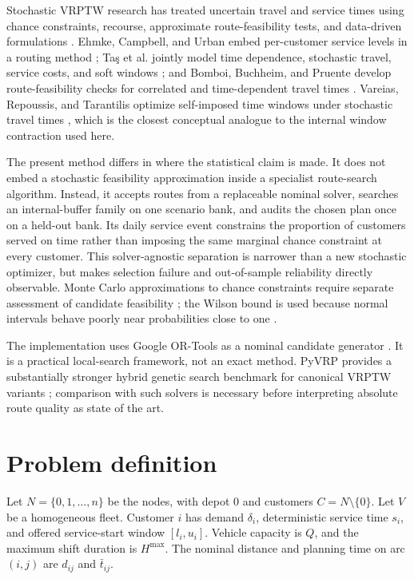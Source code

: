 \documentclass[11pt,a4paper]{article}
\begin{document}
Stochastic VRPTW research has treated uncertain travel and service times using
chance constraints, recourse, approximate route-feasibility tests, and
data-driven formulations \cite{li2010,errico2018,bomboi2022,serrano2026}.
Ehmke, Campbell, and Urban embed per-customer service levels in a routing
method \cite{ehmke2015}; Ta\c{s} et al. jointly model time dependence,
stochastic travel, service costs, and soft windows \cite{tas2014}; and Bomboi,
Buchheim, and Pruente develop route-feasibility checks for correlated and
time-dependent travel times \cite{bomboi2022}. Vareias, Repoussis, and
Tarantilis optimize self-imposed time windows under stochastic travel times
\cite{vareias2019}, which is the closest conceptual analogue to the internal
window contraction used here.

The present method differs in where the statistical claim is made. It does not
embed a stochastic feasibility approximation inside a specialist route-search
algorithm. Instead, it accepts routes from a replaceable nominal solver,
searches an internal-buffer family on one scenario bank, and audits the chosen
plan once on a held-out bank. Its daily service event constrains the proportion
of customers served on time rather than imposing the same marginal chance
constraint at every customer. This solver-agnostic separation is narrower than
a new stochastic optimizer, but makes selection failure and out-of-sample
reliability directly observable. Monte Carlo approximations to chance
constraints require separate assessment of candidate feasibility
\cite{ahmed2008}; the Wilson bound is used because normal intervals behave
poorly near probabilities close to one \cite{wilson1927,brown2001}.

The implementation uses Google OR-Tools as a nominal candidate generator
\cite{ortools}. It is a practical local-search framework, not an exact method.
PyVRP provides a substantially stronger hybrid genetic search benchmark for
canonical VRPTW variants \cite{wouda2024}; comparison with such solvers is
necessary before interpreting absolute route quality as state of the art.

\section{Problem definition}

Let $N=\{0,1,\ldots,n\}$ be the nodes, with depot 0 and customers
$C=N\setminus\{0\}$. Let $V$ be a homogeneous fleet. Customer $i$ has demand
$\delta_i$, deterministic service time $s_i$, and offered service-start window
$[l_i,u_i]$. Vehicle capacity is $Q$, and the maximum shift duration is
$H^{\max}$. The nominal distance and planning time on arc $(i,j)$ are $d_{ij}$
and $\bar t_{ij}$.
\end{document}
